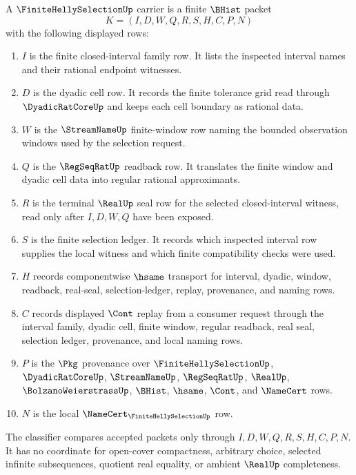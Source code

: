 \begin{definition}
\label{def:finite-helly-selection-carrier}
A $\FiniteHellySelectionUp$ carrier is a finite $\BHist$ packet
$$
K=(I,D,W,Q,R,S,H,C,P,N)
$$
with the following displayed rows:
\begin{enumerate}
\item $I$ is the finite closed-interval family row. It lists the inspected interval names and their rational endpoint witnesses.
\item $D$ is the dyadic cell row. It records the finite tolerance grid read through $\DyadicRatCoreUp$ and keeps each cell boundary as rational data.
\item $W$ is the $\StreamNameUp$ finite-window row naming the bounded observation windows used by the selection request.
\item $Q$ is the $\RegSeqRatUp$ readback row. It translates the finite window and dyadic cell data into regular rational approximants.
\item $R$ is the terminal $\RealUp$ seal row for the selected closed-interval witness, read only after $I,D,W,Q$ have been exposed.
\item $S$ is the finite selection ledger. It records which inspected interval row supplies the local witness and which finite compatibility checks were used.
\item $H$ records componentwise $\hsame$ transport for interval, dyadic, window, readback, real-seal, selection-ledger, replay, provenance, and naming rows.
\item $C$ records displayed $\Cont$ replay from a consumer request through the interval family, dyadic cell, finite window, regular readback, real seal, selection ledger, provenance, and local naming rows.
\item $P$ is the $\Pkg$ provenance over $\FiniteHellySelectionUp$, $\DyadicRatCoreUp$, $\StreamNameUp$, $\RegSeqRatUp$, $\RealUp$, $\BolzanoWeierstrassUp$, $\BHist$, $\hsame$, $\Cont$, and $\NameCert$ rows.
\item $N$ is the local $\NameCert_{\FiniteHellySelectionUp}$ row.
\end{enumerate}
The classifier compares accepted packets only through $I,D,W,Q,R,S,H,C,P,N$. It has no coordinate for open-cover compactness, arbitrary choice, selected infinite subsequences, quotient real equality, or ambient $\RealUp$ completeness.
\end{definition}

